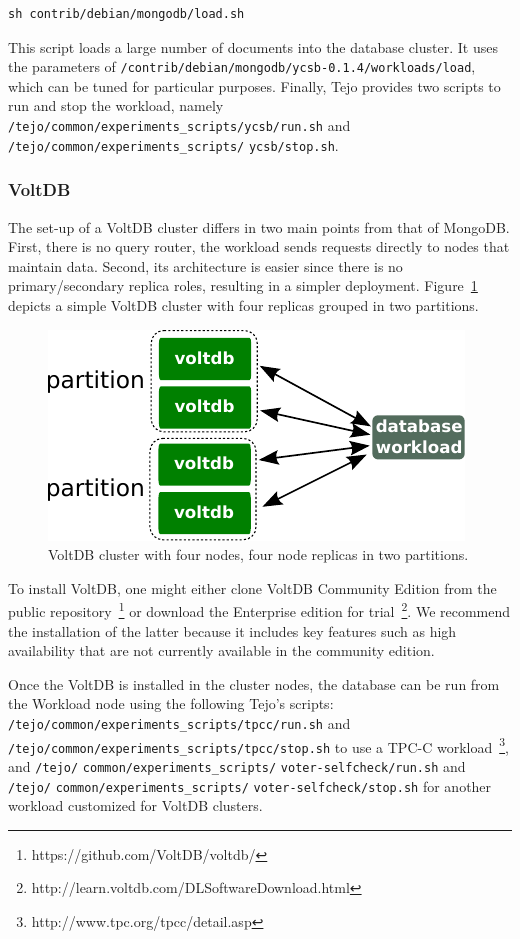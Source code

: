 \begin{lstlisting}
sh contrib/debian/mongodb/load.sh
\end{lstlisting}

This script loads a large number of documents into the database cluster. It uses the parameters of \verb|/contrib/debian/mongodb/ycsb-0.1.4/workloads/load|, which can be tuned for particular purposes. Finally, Tejo provides two scripts to run and stop the workload, namely \verb|/tejo/common/experiments_scripts/ycsb/run.sh| and \verb|/tejo/common/experiments_scripts/| \verb|ycsb/stop.sh|.


\subsubsection{VoltDB}

The set-up of a VoltDB cluster differs in two main points from that of MongoDB. First, there is no query router, the workload sends requests directly to nodes that maintain data. Second, its architecture is easier since there is no primary/secondary replica roles, resulting in a simpler deployment. Figure~\ref{fig:voltdb_cluster} depicts a simple VoltDB cluster with four replicas grouped in two partitions.

\begin{figure}[!h]
  \centering
     \includegraphics[width=.6\textwidth]{inputs/img/voltdb_cluster}
  \caption{VoltDB cluster with four nodes, four node replicas in two partitions.}
  \label{fig:voltdb_cluster}
\end{figure}

To install VoltDB, one might either clone VoltDB Community Edition from the public repository~\footnote{https://github.com/VoltDB/voltdb/} or download the Enterprise edition for trial~\footnote{http://learn.voltdb.com/DLSoftwareDownload.html}. We recommend the installation of the latter because it includes key features such as high availability that are not currently available in the community edition.

Once the VoltDB is installed in the cluster nodes, the database can be run from the Workload node using the following Tejo's scripts: \verb|/tejo/common/experiments_scripts/tpcc/run.sh| and \verb|/tejo/common/experiments_scripts/tpcc/stop.sh| to use a TPC-C workload~\footnote{http://www.tpc.org/tpcc/detail.asp}, and \verb|/tejo/| \verb|common/experiments_scripts/| \verb|voter-selfcheck/run.sh| and \verb|/tejo/| \verb|common/experiments_scripts/| \verb|voter-selfcheck/stop.sh| for another workload customized for VoltDB clusters.

